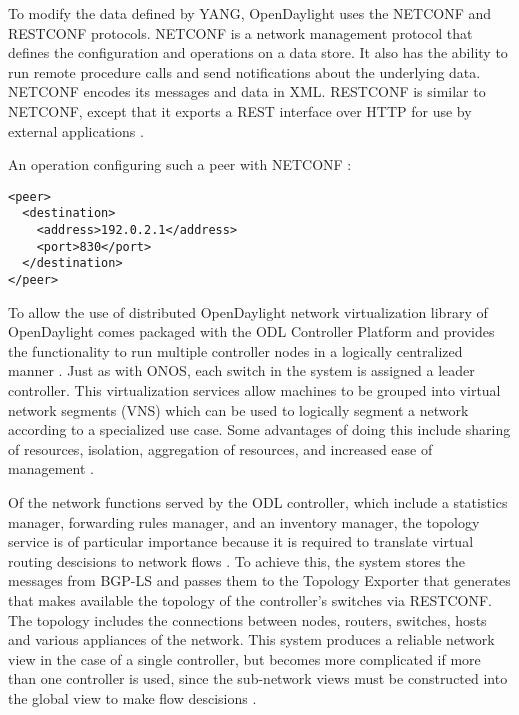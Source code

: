 \documentclass[letterpaper,twocolumn,10pt]{article}
\begin{document}
To modify the data defined by YANG, OpenDaylight uses the NETCONF and RESTCONF protocols. NETCONF is a network management protocol that defines the configuration and operations on a data store. It also has the ability to run remote procedure calls and send notifications about the underlying data. NETCONF encodes its messages and data in XML. RESTCONF is similar to NETCONF, except that it exports a REST interface over HTTP for use by external applications \cite{enns2011netconf}.

An operation configuring such a peer with NETCONF \cite{yang}:
\begin{lstlisting}
<peer>
  <destination>
    <address>192.0.2.1</address>
    <port>830</port>
  </destination>
</peer>
\end{lstlisting}


To allow the use of distributed OpenDaylight network virtualization library of OpenDaylight comes packaged with the ODL Controller Platform and provides the functionality to run multiple controller nodes in a logically centralized manner \cite{ONV:wiki}. Just as with ONOS, each switch in the system is assigned a leader controller. This virtualization services allow machines to be grouped into virtual network segments (VNS) which can be used to logically segment a network according to a specialized use case. Some advantages of doing this include sharing of resources, isolation, aggregation of resources, and increased ease of management \cite{jain2013network}.

Of the network functions served by the ODL controller, which include a statistics manager, forwarding rules manager, and an inventory manager, the topology service is of particular importance because it is required to translate virtual routing descisions to network flows \cite{jain2013network}. To achieve this, the system stores the messages from BGP-LS and passes them to the Topology Exporter that generates that makes available the topology of the controller's switches via RESTCONF. The topology includes the connections between nodes, routers, switches, hosts and various appliances of the network. This system produces a reliable network view in the case of a single controller, but becomes more complicated if more than one controller is used, since the sub-network views must be constructed into the global view to make flow descisions \cite{bgp:rfc}.

% 
% 
% 
% 
\end{document}
